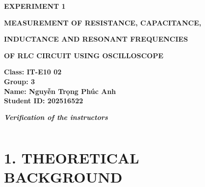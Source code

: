 \documentclass[12pt,oneside,a4paper]{article}
\theoremstyle{definition}
\begin{document}
	\renewcommand{\figurename}{Figure}
	\renewcommand{\tablename}{Table}
	
	\begin{center}
		\textbf{\Large EXPERIMENT 1}
		
		\vspace{0.5cm}
		\textbf{{\Large MEASUREMENT OF RESISTANCE, CAPACITANCE,}}
		
		\vspace{0.1cm}
		\textbf{{\Large INDUCTANCE AND RESONANT FREQUENCIES}}
		
		\vspace{0.1cm}
		\textbf{{\Large OF RLC CIRCUIT USING OSCILLOSCOPE}}
	\end{center}
	
	\vspace{0.5cm}
	
	\noindent
	\begin{minipage}[t]{0.5\textwidth}
		\vspace{0.5cm}
		\textbf{Class: IT-E10 02} \\[0.2cm]
		\textbf{Group: 3} \\[0.2cm]
		\textbf{Name: Nguyễn Trọng Phúc Anh} \\[0.2cm]
		\textbf{Student ID: 202516522}
	\end{minipage}%
	\begin{minipage}[t]{0.5\textwidth}
		\vspace{0pt}
		\centering
		\textit{\textbf{Verification of the instructors}} \\[0.2cm]
		\begin{tabular}{|p{3.5cm}|p{3.5cm}|}
			\hline
			& \\[2.5cm]
			\hline
		\end{tabular}
	\end{minipage}
	
	\vspace{0.8cm}
	
	\section*{1. THEORETICAL BACKGROUND}
	
\end{document}
